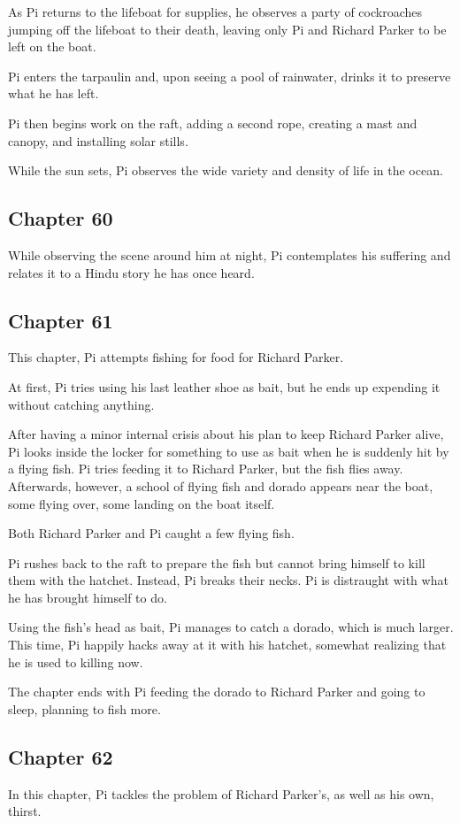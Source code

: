 \documentclass[11pt]{article}
\begin{document}
As Pi returns to the lifeboat for supplies, he observes a party of cockroaches jumping off the lifeboat to their death, leaving only Pi and Richard Parker to be left on the boat.

Pi enters the tarpaulin and, upon seeing a pool of rainwater, drinks it to preserve what he has left. 

Pi then begins work on the raft, adding a second rope, creating a mast and canopy, and installing solar stills.

While the sun sets, Pi observes the wide variety and density of life in the ocean.
\subsection{Chapter 60}
\label{sec:orga22e97b}
While observing the scene around him at night, Pi contemplates his suffering and relates it to a Hindu story he has once heard.
\subsection{Chapter 61}
\label{sec:org7faf47d}
This chapter, Pi attempts fishing for food for Richard Parker.

At first, Pi tries using his last leather shoe as bait, but he ends up expending it without catching anything.

After having a minor internal crisis about his plan to keep Richard Parker alive, Pi looks inside the locker for something to use as bait when he is suddenly hit by a flying fish. Pi tries feeding it to Richard Parker, but the fish flies away. Afterwards, however, a school of flying fish and dorado appears near the boat, some flying over, some landing on the boat itself.

Both Richard Parker and Pi caught a few flying fish.

Pi rushes back to the raft to prepare the fish but cannot bring himself to kill them with the hatchet. Instead, Pi breaks their necks. Pi is distraught with what he has brought himself to do.

Using the fish's head as bait, Pi manages to catch a dorado, which is much larger. This time, Pi happily hacks away at it with his hatchet, somewhat realizing that he is used to killing now.

The chapter ends with Pi feeding the dorado to Richard Parker and going to sleep, planning to fish more.
\subsection{Chapter 62}
\label{sec:org71a9a1b}
In this chapter, Pi tackles the problem of Richard Parker's, as well as his own, thirst.
\end{document}
